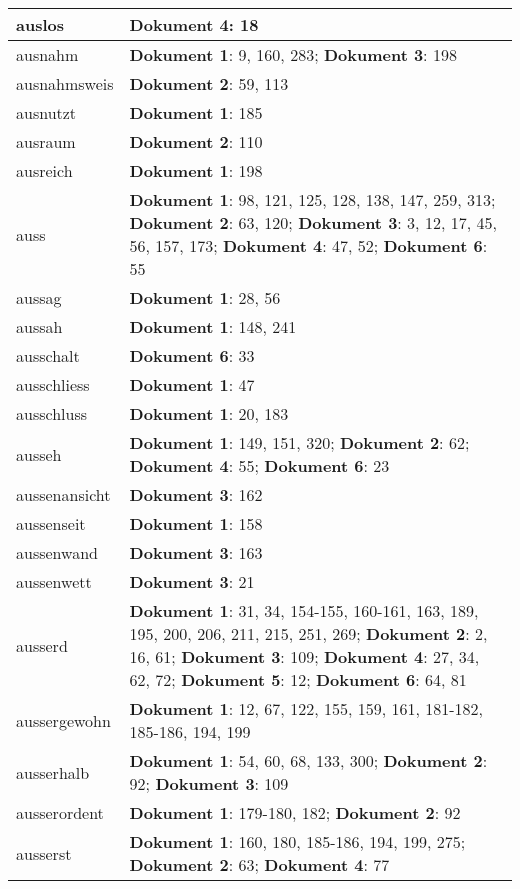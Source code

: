 \documentclass[a5paper]{article}
\begin{document}
\begin{longtable}[l]{|l|p{3in}|}
\hline
auslos & \textbf{Dokument 4}: 18 \\
\hline
ausnahm & \textbf{Dokument 1}: 9, 160, 283; \textbf{Dokument 3}: 198 \\
\hline
ausnahmsweis & \textbf{Dokument 2}: 59, 113 \\
\hline
ausnutzt & \textbf{Dokument 1}: 185 \\
\hline
ausraum & \textbf{Dokument 2}: 110 \\
\hline
ausreich & \textbf{Dokument 1}: 198 \\
\hline
auss & \textbf{Dokument 1}: 98, 121, 125, 128, 138, 147, 259, 313; \textbf{Dokument 2}: 63, 120; \textbf{Dokument 3}: 3, 12, 17, 45, 56, 157, 173; \textbf{Dokument 4}: 47, 52; \textbf{Dokument 6}: 55 \\
\hline
aussag & \textbf{Dokument 1}: 28, 56 \\
\hline
aussah & \textbf{Dokument 1}: 148, 241 \\
\hline
ausschalt & \textbf{Dokument 6}: 33 \\
\hline
ausschliess & \textbf{Dokument 1}: 47 \\
\hline
ausschluss & \textbf{Dokument 1}: 20, 183 \\
\hline
ausseh & \textbf{Dokument 1}: 149, 151, 320; \textbf{Dokument 2}: 62; \textbf{Dokument 4}: 55; \textbf{Dokument 6}: 23 \\
\hline
aussenansicht & \textbf{Dokument 3}: 162 \\
\hline
aussenseit & \textbf{Dokument 1}: 158 \\
\hline
aussenwand & \textbf{Dokument 3}: 163 \\
\hline
aussenwett & \textbf{Dokument 3}: 21 \\
\hline
ausserd & \textbf{Dokument 1}: 31, 34, 154-155, 160-161, 163, 189, 195, 200, 206, 211, 215, 251, 269; \textbf{Dokument 2}: 2, 16, 61; \textbf{Dokument 3}: 109; \textbf{Dokument 4}: 27, 34, 62, 72; \textbf{Dokument 5}: 12; \textbf{Dokument 6}: 64, 81 \\
\hline
aussergewohn & \textbf{Dokument 1}: 12, 67, 122, 155, 159, 161, 181-182, 185-186, 194, 199 \\
\hline
ausserhalb & \textbf{Dokument 1}: 54, 60, 68, 133, 300; \textbf{Dokument 2}: 92; \textbf{Dokument 3}: 109 \\
\hline
ausserordent & \textbf{Dokument 1}: 179-180, 182; \textbf{Dokument 2}: 92 \\
\hline
ausserst & \textbf{Dokument 1}: 160, 180, 185-186, 194, 199, 275; \textbf{Dokument 2}: 63; \textbf{Dokument 4}: 77 \\

\end{longtable}
\end{document}
